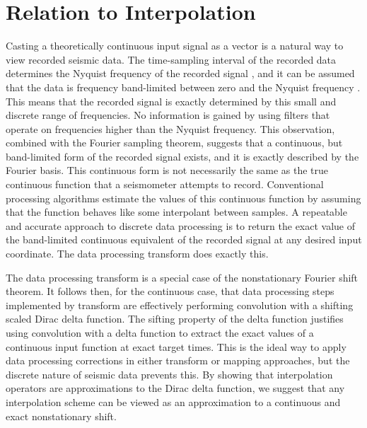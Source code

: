 \section{Relation to Interpolation}
Casting a theoretically continuous input signal as a vector is a natural way to view recorded seismic data.
The time-sampling interval of the recorded data determines the Nyquist frequency of the recorded signal \citep{gubbins04}, and it can be assumed that the data is frequency band-limited between zero and the Nyquist frequency \citep{gubbins04}.
This means that the recorded signal is exactly determined by this small and discrete range of frequencies.
No information is gained by using filters that operate on frequencies higher than the Nyquist frequency.
This observation, combined with the Fourier sampling theorem, suggests that a continuous, but band-limited form of the recorded signal exists, and it is exactly described by the Fourier basis.
This continuous form is not necessarily the same as the true continuous function that a seismometer attempts to record.
Conventional processing algorithms estimate the values of this continuous function by assuming that the function behaves like some interpolant between samples.
A repeatable and accurate approach to discrete data processing is to return the exact value of the band-limited continuous equivalent of the recorded signal at any desired input coordinate.
The data processing transform does exactly this.

The data processing transform is a special case of the nonstationary Fourier shift theorem.
It follows then, for the continuous case, that data processing steps implemented by transform are effectively performing convolution with a shifting scaled Dirac delta function.
The sifting property of the delta function justifies using convolution with a delta function to extract the exact values of a continuous input function at exact target times.
This is the ideal way to apply data processing corrections in either transform or mapping approaches, but the discrete nature of seismic data prevents this.
By showing that interpolation operators are approximations to the Dirac delta function, we suggest that any interpolation scheme can be viewed as an approximation to a continuous and exact nonstationary shift.

